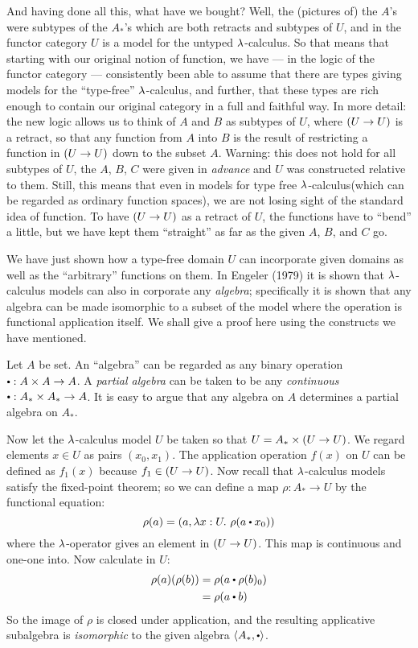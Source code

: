 And having done all this, what have we bought? Well, the (pictures of) the $A$'s were
subtypes of the $A_*$'s which are both retracts and subtypes of $U$, and in the functor
category $U$ is a model for the untyped $\lambda$-calculus. So that means that starting with
our original notion of function, we have --- in the logic of the functor category ---
consistently been able to assume that there are types giving models for the ``type-free''
$\lambda$-calculus, and further, that these types are rich enough to contain our original
category in a full and faithful way. In more detail: the new logic allows us to think of
$A$ and $B$ as subtypes of $U$, where $(U\rightarrow U)$ is a retract, so that any function from $A$
into $B$ is the result of restricting a function in $(U\rightarrow U)$ down to the subset $A$. Warning:
this does not hold for all subtypes of $U$, the $A$, $B$, $C$ were given in {\it advance}
and $U$ was constructed relative to them. Still, this means that even in models for type
free $\lambda$-calculus(which can be regarded as ordinary function spaces), we are not losing
sight of the standard idea of function. To have $(U\rightarrow U)$ as a retract of $U$, the functions
have to ``bend'' a little, but we have kept them ``straight'' as far as the given $A$,
$B$, and $C$ go.

We have just shown how a type-free domain $U$ can incorporate given domains as well as the
``arbitrary'' functions on them. In Engeler (1979) it is shown that $\lambda$-calculus models
can also in corporate any {\it algebra}; specifically it is shown that any algebra can be
made isomorphic to a subset of the model where the operation is functional application
itself. We shall give a proof here using the constructs we have mentioned.

Let $A$ be set. An ``algebra'' can be regarded as any binary operation $\dotop :  A\times
A\to A$. A {\it partial algebra} can be taken to be any {\it continuous} $\dotop : A_* \times A_* \to
A$. It is easy to argue that any algebra on $A$ determines a partial algebra on $A_*$.

Now let the $\lambda$-calculus model $U$ be taken so that $U = A_* \times  (U\rightarrow U)$. We regard
elements $x \in U$ as pairs $(x_0 , x_1 )$. The application operation $f(x)$ on $U$ can be
defined as $f_1(x)$ because $f_1 \in (U\rightarrow U)$. Now recall that $\lambda$-calculus models satisfy
the fixed-point theorem; so we can define a map $\rho: A_*\to U$ by the functional
equation:
$$
\rho(a)  =  (a, \l x: U. \,\,\rho (a \dotop x_0))
$$
where the $\lambda$-operator gives an element in $(U\rightarrow U)$. This map is continuous and one-one
into. Now calculate in $U$:
\begin{align*}
\rho(a)(\rho(b)) &= \rho(a\dotop \rho(b)_0)\\
&= \rho( a  \dotop  b)
\end{align*}
So the image of $\rho$ is closed under application, and the resulting applicative
subalgebra is {\it isomorphic} to the given algebra $\langle A_*, \dotop \rangle$.

